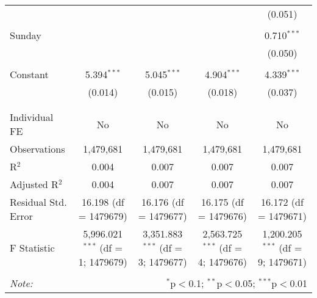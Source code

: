 \documentclass[
]{article}
\begin{document}
\begin{table}[!htbp]
{\begin{tabular}{@{\extracolsep{5pt}}lcccc}
  &  &  &  & (0.051) \\ 
  & & & & \\ 
 Sunday &  &  &  & 0.710$^{***}$ \\ 
  &  &  &  & (0.050) \\ 
  & & & & \\ 
 Constant & 5.394$^{***}$ & 5.045$^{***}$ & 4.904$^{***}$ & 4.339$^{***}$ \\ 
  & (0.014) & (0.015) & (0.018) & (0.037) \\ 
  & & & & \\ 
\hline \\[-1.8ex] 
Individual FE & No & No & No & No \\ 
Observations & 1,479,681 & 1,479,681 & 1,479,681 & 1,479,681 \\ 
R$^{2}$ & 0.004 & 0.007 & 0.007 & 0.007 \\ 
Adjusted R$^{2}$ & 0.004 & 0.007 & 0.007 & 0.007 \\ 
Residual Std. Error & 16.198 (df = 1479679) & 16.176 (df = 1479677) & 16.175 (df = 1479676) & 16.172 (df = 1479671) \\ 
F Statistic & 5,996.021$^{***}$ (df = 1; 1479679) & 3,351.883$^{***}$ (df = 3; 1479677) & 2,563.725$^{***}$ (df = 4; 1479676) & 1,200.205$^{***}$ (df = 9; 1479671) \\ 
\hline 
\hline \\[-1.8ex] 
\textit{Note:}  & \multicolumn{4}{r}{$^{*}$p$<$0.1; $^{**}$p$<$0.05; $^{***}$p$<$0.01} \\ 
\end{tabular}
} 
\end{table} 
\newpage
\end{document}
